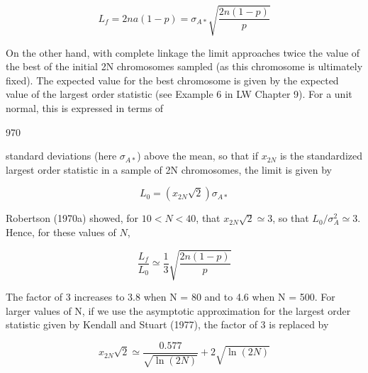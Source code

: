 \documentclass{article}
\begin{document}
\begin{equation}
L_{f}=2na(1-p)=\sigma_{A*}\sqrt{\frac{2n(1-p)}{p}}
\tag{26.19}
\label{eq:26_19}
\end{equation}

On the other hand, with complete linkage the limit approaches twice the value of the best of the initial 2N chromosomes sampled (as this chromosome is ultimately fixed). The expected value for the best chromosome is given by the expected value of the largest order statistic (see Example 6 in LW Chapter 9). For a unit normal, this is expressed in terms of

970

standard deviations (here  $ \sigma_{A*} $) above the mean, so that if  $ x_{2N} $ is the standardized largest order statistic in a sample of 2N chromosomes, the limit is given by

\begin{equation}
L_{0}=(x_{2N}\sqrt{2})\sigma_{A*}
\tag{26.20a}
\label{eq:26_20a}
\end{equation}

Robertson (1970a) showed, for $10 < N < 40$, that $x_{2N} \sqrt{2} \simeq 3$, so that $L_{0}/\sigma_{A}^{2} \simeq 3$. Hence, for these values of $N$,

\begin{equation}
\frac{L_{f}}{L_{0}}\simeq\frac{1}{3}\sqrt{\frac{2n(1-p)}{p}}
\tag{26.20b}
\label{eq:26_20b}
\end{equation}

The factor of 3 increases to 3.8 when N = 80 and to 4.6 when N = 500. For larger values of N, if we use the asymptotic approximation for the largest order statistic given by Kendall and Stuart (1977), the factor of 3 is replaced by

\begin{equation}
x_{2N}\sqrt{2}\simeq\frac{0.577}{\sqrt{\ln(2N)}}+2\sqrt{\ln(2N)}
\tag{26.20c}
\label{eq:26_20c}
\end{equation}
\end{document}
